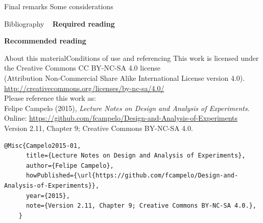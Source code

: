 \documentclass[t]{beamer}
\begin{document}

\begin{ftst}
{Final remarks}
{Some considerations}

\end{ftst}



\begin{ftst}
{Bibliography}
{\ }
\scriptsize
\textbf{Required reading}

\benums  %
\eenum

\textbf{Recommended reading}

\benums %
\item %
\eenum
\end{ftst}


\begin{ftstf}{About this material}{Conditions of use and referencing}
\centering\footnotesize This work is licensed under the Creative Commons CC BY-NC-SA 4.0 license\\(Attribution Non-Commercial Share Alike International License version 4.0).\\
\vhalf
\url{http://creativecommons.org/licenses/by-nc-sa/4.0/}\\
\vone
\footnotesize Please reference this work as:\\
\footnotesize \flushleft Felipe Campelo (2015), \textit{Lecture Notes on Design and Analysis of Experiments}.\\Online: {\scriptsize\url{https://github.com/fcampelo/Design-and-Analysis-of-Experiments}}\\
Version 2.11, Chapter 9; Creative Commons BY-NC-SA 4.0.\\

\begin{Verbatim}[fontsize=\tiny]
    @Misc{Campelo2015-01,
      title={Lecture Notes on Design and Analysis of Experiments},
      author={Felipe Campelo},
      howPublished={\url{https://github.com/fcampelo/Design-and-Analysis-of-Experiments}},
      year={2015},
      note={Version 2.11, Chapter 9; Creative Commons BY-NC-SA 4.0.},
    }
\end{Verbatim}

\end{ftstf}
\end{document}
